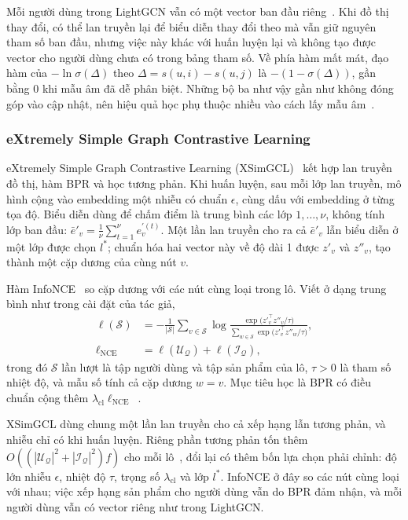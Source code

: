 Mỗi người dùng trong LightGCN vẫn có một vector ban đầu riêng~\cite{he2020lightgcn}. Khi đồ thị thay đổi, có thể lan truyền lại để biểu diễn thay đổi theo mà vẫn giữ nguyên tham số ban đầu, nhưng việc này khác với huấn luyện lại và không tạo được vector cho người dùng chưa có trong bảng tham số. Về phía hàm mất mát, đạo hàm của $-\ln\sigma(\Delta)$ theo $\Delta=s(u,i)-s(u,j)$ là $-(1-\sigma(\Delta))$, gần bằng 0 khi mẫu âm đã dễ phân biệt. Những bộ ba như vậy gần như không đóng góp vào cập nhật, nên hiệu quả học phụ thuộc nhiều vào cách lấy mẫu âm~\cite{rendle2009bpr,wu2024sampledsoftmax}.

\subsubsection{eXtremely Simple Graph Contrastive Learning}
\label{sec:xsimgcl}

eXtremely Simple Graph Contrastive Learning (XSimGCL)~\cite{yu2023xsimgcl} kết hợp lan truyền đồ thị, hàm BPR và học tương phản. Khi huấn luyện, sau mỗi lớp lan truyền, mô hình cộng vào embedding một nhiễu có chuẩn $\epsilon$, cùng dấu với embedding ở từng tọa độ. Biểu diễn dùng để chấm điểm là trung bình các lớp $1,\ldots,\nu$, không tính lớp ban đầu: $\bar e'_v=\frac{1}{\nu}\sum_{t=1}^{\nu}e_v^{\prime(t)}$. Một lần lan truyền cho ra cả $\bar e'_v$ lẫn biểu diễn ở một lớp được chọn $l^*$; chuẩn hóa hai vector này về độ dài 1 được $z'_v$ và $z''_v$, tạo thành một cặp dương của cùng nút $v$.

Hàm InfoNCE~\cite{oord2018cpc} so cặp dương với các nút cùng loại trong lô. Viết ở dạng trung bình như trong cài đặt của tác giả,
\begin{equation}
\begin{aligned}
\ell(\mathcal{S})&=-\frac{1}{|\mathcal{S}|}\sum_{v\in\mathcal{S}}\log\frac{\exp\bigl(z'^{\top}_{v}z''_v/\tau\bigr)}{\sum_{w\in\mathcal{S}}\exp\bigl(z'^{\top}_{v}z''_w/\tau\bigr)},\\
\ell_{\mathrm{NCE}}&=\ell(\mathcal{U}_{\mathcal{Q}})+\ell(\mathcal{I}_{\mathcal{Q}}),
\end{aligned}
\label{eq:infonce}
\end{equation}
trong đó $\mathcal{S}$ lần lượt là tập người dùng và tập sản phẩm của lô, $\tau>0$ là tham số nhiệt độ, và mẫu số tính cả cặp dương $w=v$. Mục tiêu học là BPR có điều chuẩn cộng thêm $\lambda_{\mathrm{cl}}\ell_{\mathrm{NCE}}$~\cite{yu2023xsimgcl}.

XSimGCL dùng chung một lần lan truyền cho cả xếp hạng lẫn tương phản, và nhiễu chỉ có khi huấn luyện. Riêng phần tương phản tốn thêm $O((|\mathcal{U}_{\mathcal{Q}}|^2+|\mathcal{I}_{\mathcal{Q}}|^2)f)$ cho mỗi lô~\cite{yu2023xsimgcl}, đổi lại có thêm bốn lựa chọn phải chỉnh: độ lớn nhiễu $\epsilon$, nhiệt độ $\tau$, trọng số $\lambda_{\mathrm{cl}}$ và lớp $l^*$. InfoNCE ở đây so các nút cùng loại với nhau; việc xếp hạng sản phẩm cho người dùng vẫn do BPR đảm nhận, và mỗi người dùng vẫn có vector riêng như trong LightGCN.

